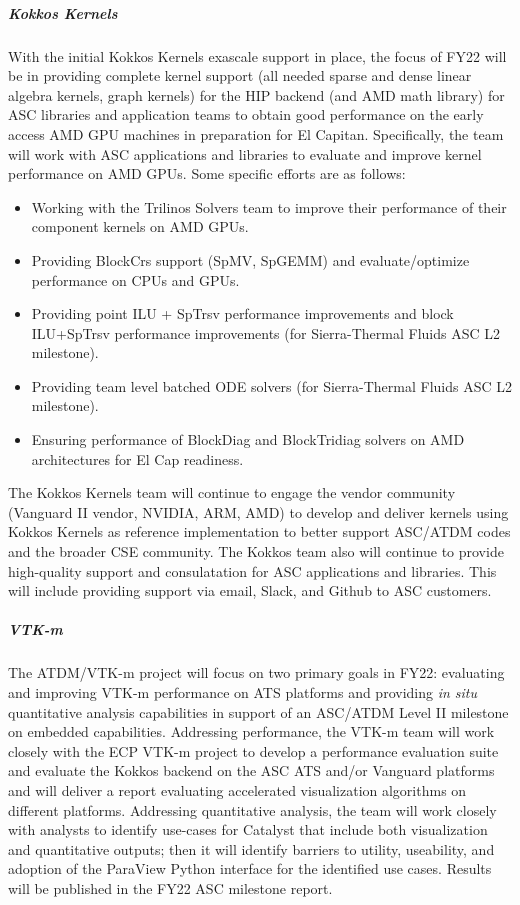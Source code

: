 \subparagraph{Kokkos Kernels} With the initial Kokkos Kernels exascale support in place, the focus of FY22 will be in providing complete kernel support (all needed sparse and dense linear algebra kernels, graph kernels) for the HIP backend (and AMD math library) for ASC libraries and application teams to obtain good performance on the early access AMD GPU machines in preparation for El Capitan.  Specifically, the team will work with ASC applications and libraries to evaluate and improve kernel performance on AMD GPUs.  Some specific efforts are as follows:
\begin{itemize}
\item Working with the Trilinos Solvers team to improve their performance of their component kernels on AMD GPUs.  
\item Providing BlockCrs support (SpMV, SpGEMM) and evaluate/optimize performance on CPUs and GPUs.  
\item Providing point ILU + SpTrsv performance improvements and block ILU+SpTrsv performance improvements (for Sierra-Thermal Fluids ASC L2 milestone).  
\item Providing team level batched ODE solvers (for Sierra-Thermal Fluids ASC L2 milestone).  
\item Ensuring performance of BlockDiag and BlockTridiag solvers on AMD architectures for El Cap readiness.
\end{itemize}

The Kokkos Kernels team will continue to engage the vendor community (Vanguard II vendor, NVIDIA, ARM, AMD) to develop and deliver kernels using Kokkos Kernels as reference implementation to better support ASC/ATDM codes and the broader CSE community.  The Kokkos team also will continue to provide high-quality support and consulatation for ASC applications and libraries.  This will include providing support via email, Slack, and Github to ASC customers.

 
\subparagraph{VTK-m} The ATDM/VTK-m project will focus on two primary goals in FY22: evaluating and improving VTK-m performance on ATS platforms and providing \emph{in situ} quantitative analysis capabilities in support of an ASC/ATDM Level II milestone on embedded capabilities.   Addressing performance, the VTK-m team will work closely with the ECP VTK-m project to develop a performance evaluation suite and evaluate the Kokkos backend on the ASC ATS and/or Vanguard platforms and will deliver a report evaluating accelerated visualization algorithms on different platforms.  Addressing quantitative analysis, the team will work closely with analysts to identify use-cases for Catalyst that include both visualization and quantitative outputs; then it will identify barriers to utility, useability, and adoption of the ParaView Python interface for the identified use cases.  Results will be published in the FY22 ASC milestone report. 

